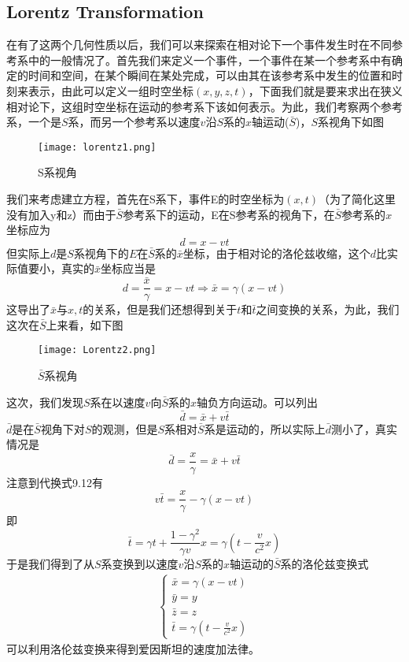 \documentclass[14pt,oneside]{book}
\begin{document}
\begin{large}
\subsection{Lorentz Transformation}
在有了这两个几何性质以后，我们可以来探索在相对论下一个事件发生时在不同参考系中的一般情况了。首先我们来定义一个事件，一个事件在某一个参考系中有确定的时间和空间，在某个瞬间在某处完成，可以由其在该参考系中发生的位置和时刻来表示，由此可以定义一组时空坐标$(x,y,z,t)$，下面我们就是要来求出在狭义相对论下，这组时空坐标在运动的参考系下该如何表示。为此，我们考察两个参考系，一个是$S$系，而另一个参考系以速度$v$沿$S$系的$x$轴运动($\bar S$)，$S$系视角下如图
\begin{figure}[H]
\centering
  \texttt{[image: lorentz1.png]}
  \caption{S系视角}
\end{figure}
我们来考虑建立方程，首先在S系下，事件E的时空坐标为$(x,t)$（为了简化这里没有加入y和z）而由于$\bar S$参考系下的运动，E在S参考系的视角下，在$\bar S$参考系的$x$坐标应为
\begin{equation}
  d=x-vt
\end{equation}
但实际上$d$是$S$系视角下的$E$在$\bar S$系的$\bar x$坐标，由于相对论的洛伦兹收缩，这个$d$比实际值要小，真实的$\bar x$坐标应当是
\begin{equation}
  d=\frac{\bar x}{\gamma}=x-vt\Rightarrow\bar x=\gamma(x-vt)
\end{equation}
这导出了$\bar x$与$x,t$的关系，但是我们还想得到关于$t$和$\bar t$之间变换的关系，为此，我们这次在$\bar S$上来看，如下图 \begin{figure}[H]
\centering
  \texttt{[image: Lorentz2.png]}
  \caption{$\bar S$系视角}
\end{figure}
这次，我们发现$S$系在以速度$v$向$\bar S$系的$x$轴负方向运动。可以列出
\begin{equation}
  \bar d=\bar x+v\bar t
\end{equation}
$\bar d$是在$\bar S$视角下对$S$的观测，但是$S$系相对$\bar S$系是运动的，所以实际上$\bar d$测小了，真实情况是
\begin{equation}
  \bar d=\frac{x}{\gamma}=\bar x+v\bar t
\end{equation}
注意到代换式9.12有
\begin{equation}
  v\bar t=\frac{x}{\gamma}-\gamma(x-vt)
\end{equation}
即
\begin{equation}
  \bar t=\gamma t+\frac{1-\gamma^2}{\gamma v}x=\gamma(t-\frac{v}{c^2}x)
\end{equation}
于是我们得到了从$S$系变换到以速度$v$沿$S$系的$x$轴运动的$\bar S$系的洛伦兹变换式
\begin{align}
	\begin{cases}
		\bar x=\gamma(x-vt)\\
	  \bar y=y\\
	  \bar z=z\\
	  \bar t =\gamma(t-\frac{v}{c^2}x)
	\end{cases}
\end{align}
可以利用洛伦兹变换来得到爱因斯坦的速度加法律。


\end{large}
\end{document}
